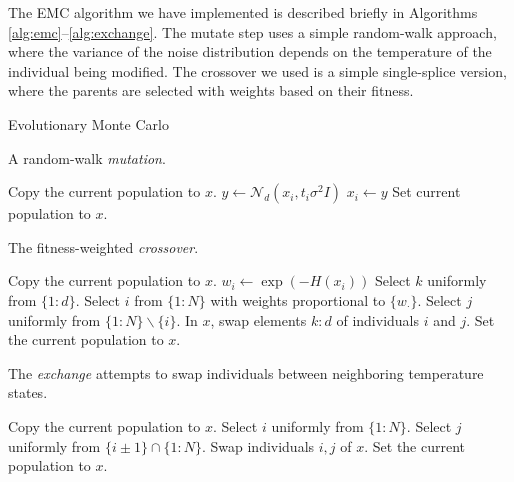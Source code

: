 \documentclass[12pt]{article}\usepackage[]{graphicx}\usepackage[]{color}
\begin{document}
The EMC algorithm we have implemented is described briefly in
Algorithms \ref{alg:emc}--\ref{alg:exchange}.  The mutate step uses a
simple random-walk approach, where the variance of the noise
distribution depends on the temperature of the individual being
modified.  The crossover we used is a simple single-splice version,
where the parents are selected with weights based on their fitness.


\begin{algorithm}
  \caption{Evolutionary Monte Carlo}
  \label{alg:emc}
  \footnotesize
  \begin{algorithmic}
      \State {} \Ow \State {}
    \EndWp
    \State {}
    \EndProcedure
\end{algorithmic}
\end{algorithm}


\begin{algorithm}
  \caption{A random-walk \emph{mutation}.}
  \label{alg:mutate}
  \footnotesize
  \begin{algorithmic}
   \State Copy the current population to $x$.   \State $y \gets \mathcal N_d(x_i,t_i \sigma^2I)$  \State $x_i \gets y$
    \EndWp
    \EndFor
    \State Set current population to $x$.
    \EndProcedure
\end{algorithmic}
\end{algorithm}

\begin{algorithm}
  \caption{The fitness-weighted \emph{crossover}.}
  \label{alg:crossover}
  \footnotesize
  \begin{algorithmic}
   \State Copy the current population to $x$.   \State $w_i \gets \exp(-H(x_i))$
    \EndFor
    \State Select $k$ uniformly from $\{1\colon d\}.$ \State Select $i$ from $\{1\colon N\}$ with weights proportional to $\{w_\cdot\}$.  \State Select $j$ uniformly from $\{1\colon N\} \backslash \{i\}.$ \State In $x$, swap elements $k\colon d$ of individuals $i$ and $j$.   \State Set the current population to $x$.
    \EndWp
    \EndProcedure
\end{algorithmic}
\end{algorithm}

\begin{algorithm}
  \caption{The \emph{exchange} attempts to swap individuals between neighboring temperature states.}
  \label{alg:exchange}
  \footnotesize
  \begin{algorithmic}
   \State Copy the current population to $x$.  \State Select $i$ uniformly from $\{1\colon N\}$.  \State Select $j$ uniformly from $\{i\pm 1\}\cap\{1\colon N\}$.  \State Swap individuals $i,j$ of $x$.   \State Set the current population to $x$.
    \EndWp
    \EndProcedure
\end{algorithmic}
\end{algorithm}
\end{document}
